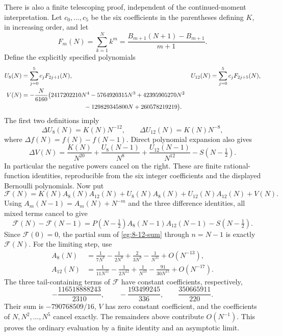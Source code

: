 \documentclass[11pt]{article}
\theoremstyle{definition}
\theoremstyle{remark}
\numberwithin{equation}{section}
\begin{document}
There is also a finite telescoping proof, independent of the
continued-moment interpretation. Let $c_0,\ldots,c_5$ be the six
coefficients in the parentheses defining $K$, in increasing order,
and let
\[
 F_m(N)=\sum_{k=1}^N k^m
       =\frac{B_{m+1}(N+1)-B_{m+1}}{m+1}.
\]
Define the explicitly specified polynomials
\begin{align*}
 U_8(N)&=\sum_{j=0}^5c_jF_{2j+1}(N),&
 U_{12}(N)&=\sum_{j=0}^5c_jF_{2j+5}(N),\\
 V(N)&=-\frac{N}{6160}\bigl(
 2417202210N^4-5764920315N^3+42395905270N^2\notag\\
 &\hspace{36mm}-129829345800N+260578219219\bigr).
\end{align*}
The first two definitions imply
\[
 \Delta U_8(N)=K(N)N^{-12},\qquad
 \Delta U_{12}(N)=K(N)N^{-8},
\]
where $\Delta f(N)=f(N)-f(N-1)$. Direct polynomial expansion also
gives
\begin{equation}\label{eg:V-difference}
 \Delta V(N)=\frac{K(N)}{N^{20}}+
      \frac{U_8(N-1)}{N^8}+\frac{U_{12}(N-1)}{N^{12}}
                         -S(N-\tfrac12).
\end{equation}
In particular the negative powers cancel on the right. These are
finite rational-function identities, reproducible from the six
integer coefficients and the displayed Bernoulli polynomials.
Now put
\[
 \mathcal F(N)=K(N)A_8(N)A_{12}(N)
                 +U_8(N)A_8(N)+U_{12}(N)A_{12}(N)+V(N).
\]
Using $A_m(N-1)=A_m(N)+N^{-m}$ and the three difference identities,
all mixed terms cancel to give
\[
 \mathcal F(N)-\mathcal F(N-1)
 =P(N-\tfrac12)A_8(N-1)A_{12}(N-1)-S(N-\tfrac12).
\]
Since $\mathcal F(0)=0$, the partial sum of
\eqref{eg:8-12-sum} through $n=N-1$ is exactly $\mathcal F(N)$.
For the limiting step, use
\begin{align*}
 A_8(N)&=\frac1{7N^7}-\frac1{2N^8}+\frac2{3N^9}
                                      -\frac1{N^{11}}+O(N^{-13}),\\
 A_{12}(N)&=\frac1{11N^{11}}-\frac1{2N^{12}}+\frac1{N^{13}}
                                 -\frac{91}{30N^{15}}+O(N^{-17}).
\end{align*}
The three tail-containing terms of $\mathcal F$ have constant
coefficients, respectively,
\[
       -\frac{116518888243}{2310},\qquad
       -\frac{193499245}{336},\qquad
        \frac{350665911}{220}.
\]
Their sum is $-790768509/16$, $V$ has zero constant coefficient,
and the coefficients of $N,N^2,\ldots,N^5$ cancel exactly.
The remainders above contribute $O(N^{-1})$. This proves the
ordinary evaluation by a finite identity and an asymptotic limit.
\end{document}
